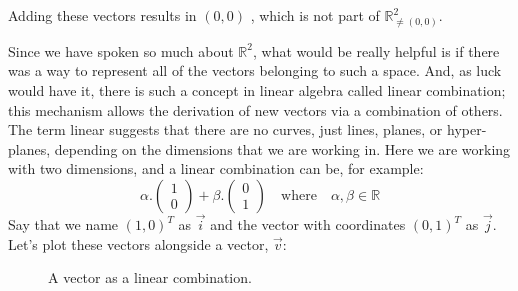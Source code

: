\documentclass[a4,12pt,twosided,openany]{memoir}
\begin{document}
Adding these vectors results in $(0,0)$ , which is not part of  $\mathbb R^2_{\ne (0,0)}$. 
\par 
\indent
Since we have spoken so much about $\mathbb{R}^2$, what would be really helpful is if there was a way to represent all of the vectors belonging to such a space. And, as luck would have it, there is such a concept in linear algebra called linear combination; this mechanism allows the derivation of new vectors via a combination of others. The term linear suggests that there are no curves, just lines, planes, or hyper-planes, depending on the dimensions that we are working in. Here we are working with two dimensions, and a linear combination can be, for example:
\[ \alpha.\begin{pmatrix}
 1 \\
 0
 \end{pmatrix} + \beta.\begin{pmatrix}
 0 \\
 1
 \end{pmatrix} \quad \textrm{where} \quad  \alpha, \beta \in \mathbb{R} \]
Say that we name $(1,0)^T$ as $\overrightarrow{i}$ and the vector with coordinates $(0,1)^T$ as $\overrightarrow{j}$. Let’s plot these vectors alongside a vector, $\overrightarrow{v}$:
\begin{figure}[h!]
\begin{center}
\end{center}
\caption{A vector as a linear combination.}\label{fig:lcexample}
\end{figure}
\end{document}
